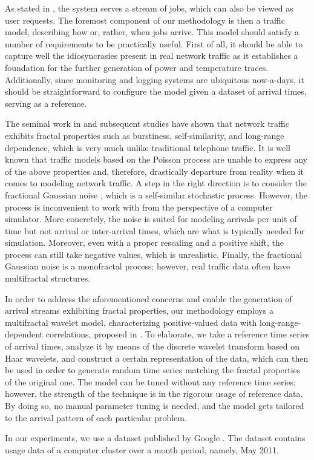 As stated in , the system serves a stream of jobs,
which can also be viewed as user requests. The foremost component of our
methodology is then a traffic model, describing how or, rather, when jobs
arrive. This model should satisfy a number of requirements to be practically
useful. First of all, it should be able to capture well the idiosyncrasies
present in real network traffic as it establishes a foundation for the further
generation of power and temperature traces. Additionally, since monitoring and
logging systems are ubiquitous now-a-days, it should be straightforward to
configure the model given a dataset of arrival times, serving as a reference.

The seminal work in \cite{leland1994} and subsequent studies have shown that
network traffic exhibits fractal properties such as burstiness, self-similarity,
and long-range dependence, which is very much unlike traditional telephone
traffic. It is well known that traffic models based on the Poisson process
\cite{lifshits2014} are unable to express any of the above properties and,
therefore, drastically departure from reality when it comes to modeling network
traffic. A step in the right direction is to consider the fractional Gaussian
noise \cite{lifshits2014}, which is a self-similar stochastic process. However,
the process is inconvenient to work with from the perspective of a computer
simulator. More concretely, the noise is suited for modeling arrivals per unit
of time but not arrival or inter-arrival times, which are what is typically
needed for simulation. Moreover, even with a proper rescaling and a positive
shift, the process can still take negative values, which is unrealistic.
Finally, the fractional Gaussian noise is a monofractal process; however, real
traffic data often have multifractal structures.

In order to address the aforementioned concerns and enable the generation of
arrival streams exhibiting fractal properties, our methodology employs a
multifractal wavelet model, characterizing positive-valued data with
long-range-dependent correlations, proposed in \cite{riedi1999}. To elaborate,
we take a reference time series of arrival times, analyze it by means of the
discrete wavelet transform based on Haar wavelets, and construct a certain
representation of the data, which can then be used in order to generate random
time series matching the fractal properties of the original one. The model can
be tuned without any reference time series; however, the strength of the
technique is in the rigorous usage of reference data. By doing so, no manual
parameter tuning is needed, and the model gets tailored to the arrival pattern
of each particular problem.

In our experiments, we use a dataset published by Google \cite{google}. The
dataset contains usage data of a computer cluster over a month period, namely,
May 2011.
